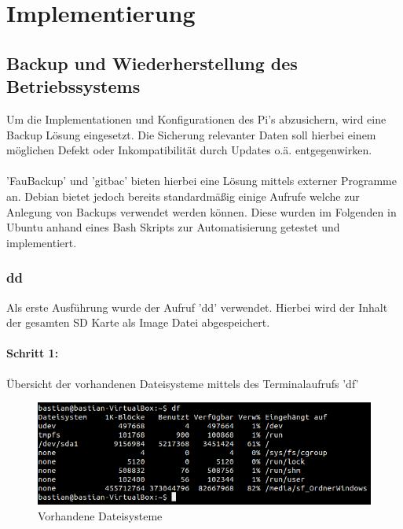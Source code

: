 \chapter{Implementierung}
\section{Backup und Wiederherstellung des Betriebssystems}

Um die Implementationen und Konfigurationen des Pi's abzusichern, wird eine Backup Lösung eingesetzt. Die Sicherung relevanter Daten soll hierbei einem möglichen Defekt oder Inkompatibilität durch Updates o.ä. entgegenwirken.\\
\\
'FauBackup' und 'gitbac' bieten hierbei eine Lösung mittels externer Programme an. Debian bietet jedoch bereits standardmäßig einige Aufrufe welche zur Anlegung von Backups verwendet werden können. Diese wurden im Folgenden in Ubuntu anhand eines Bash Skripts zur Automatisierung getestet und implementiert.

\subsection{dd}
Als erste Ausführung wurde der Aufruf 'dd' verwendet. Hierbei wird der Inhalt der gesamten SD Karte als Image Datei abgespeichert.

\subsubsection*{Schritt 1:}
Übersicht der vorhandenen Dateisysteme mittels des Terminalaufrufs 'df'
\begin{figure}[ht]
\includegraphics[width=\textwidth]{pictures/Bastian/BILD1_df}
\caption{Vorhandene Dateisysteme}
\end{figure}
\newpage %

